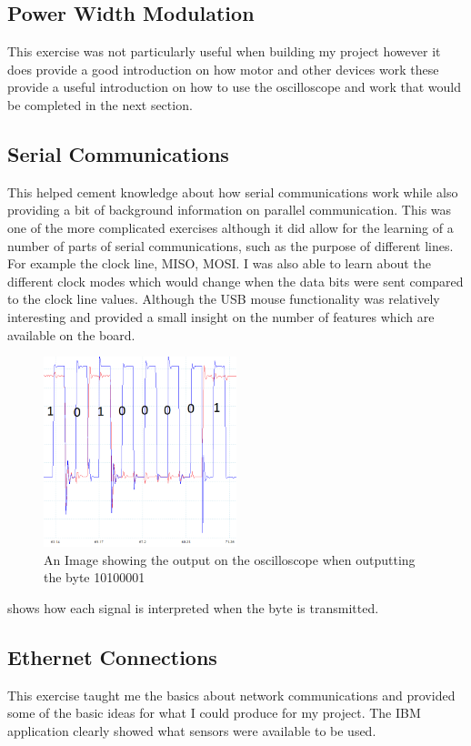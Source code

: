 \documentclass[a4paper,12pt]{scrartcl}
\begin{document}
{		\subsection{Power Width Modulation}
		{
			This exercise was not particularly useful when building my project however it does provide a good introduction on how motor and other devices work these provide a useful introduction on how to use the oscilloscope and work that would be completed in the next section.
		}
		\subsection{Serial Communications}
		{
			This helped cement knowledge about how serial communications work while also providing a bit of background information on parallel communication. This was one of the more complicated exercises although it did allow for the learning of a number of parts of serial communications, such as the purpose of different lines. For example the clock line, MISO, MOSI. I was also able to learn about the different clock modes which would change when the data bits were sent compared to the clock line values. Although the USB mouse functionality was relatively interesting and provided a small insight on the number of features which are available on the board.
			\begin{figure}[h]
				\centering
				\includegraphics[width=0.5\textwidth]{Task1-Edited}
				\caption{An Image showing the output on the oscilloscope when outputting the byte 10100001}
				\label{img:AnotatedByteOutput}
			\end{figure}
			 shows how each signal is interpreted when the byte is transmitted.
		}
		\subsection{Ethernet Connections}
		{
			This exercise taught me the basics about network communications and provided some of the basic ideas for what I could produce for my project. The IBM application clearly showed what sensors were available to be used.
		}
	}
\end{document}
